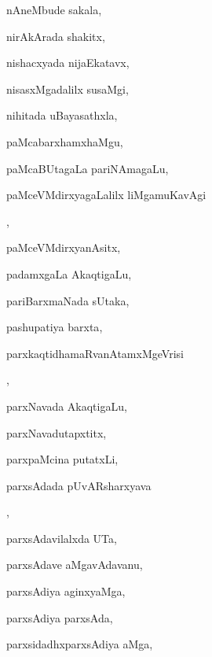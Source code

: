 \begin{multicols}{3}
{\noindent
{nAneMbude sakala}, \pageref{nAneMbude sakala}

\noindent
{nirAkArada shakitx}, \pageref{nirAkArada shakitx}

\noindent
{nishacxyada nijaEkatavx}, \pageref{nishacxyada nijaEkatavx}

\noindent
{nisasxMgadalilx susaMgi}, \pageref{nisasxMgadalilx susaMgi}

\noindent
{nihitada uBayasathxla}, \pageref{nihitada uBayasathxla}

\noindent
{paMcabarxhamxhaMgu}, \pageref{paMcabarxhamxhaMgu}

\noindent
{paMcaBUtagaLa pariNAmagaLu}, \pageref{paMcaBUtagaLa pariNAmagaLu}

\noindent
{paMceVMdirxyagaLalilx liMgamuKavAgi}

\noindent
{}, \pageref{paMceVMdirxyagaLalilx liMgamuKavAgi koLuLxvudu}

\noindent
{paMceVMdirxyanAsitx}, \pageref{paMceVMdirxyanAsitx}

\noindent
{padamxgaLa AkaqtigaLu}, \pageref{padamxgaLa AkaqtigaLu}

\noindent
{pariBarxmaNada sUtaka}, \pageref{pariBarxmaNada sUtaka}

\noindent
{pashupatiya barxta}, \pageref{pashupatiya barxta}

\noindent
{parxkaqtidhamaRvanAtamxMgeVrisi}

\noindent
{}, \pageref{parxkaqtidhamaRvanAtamxMgeVrisi kAba jaDa}

\noindent
{parxNavada AkaqtigaLu}, \pageref{parxNavada AkaqtigaLu}

\noindent
{parxNavadutapxtitx}, \pageref{parxNavadutapxtitx}

\noindent
{parxpaMcina putatxLi}, \pageref{parxpaMcina putatxLi}

\noindent
{parxsAdada pUvARsharxyava}

\noindent
{}, \pageref{parxsAdada pUvARsharxyava kaLeyuvudu}

\noindent
{parxsAdavilalxda UTa}, \pageref{parxsAdavilalxda UTa}

\noindent
{parxsAdave aMgavAdavanu}, \pageref{parxsAdave aMgavAdavanu}

\noindent
{parxsAdiya aginxyaMga}, \pageref{parxsAdiya aginxyaMga}

\noindent
{parxsAdiya parxsAda}, \pageref{parxsAdiya parxsAda}

\noindent
{parxsidadhxparxsAdiya aMga}, \pageref{parxsidadhxparxsAdiya aMga}

}
\end{multicols}
